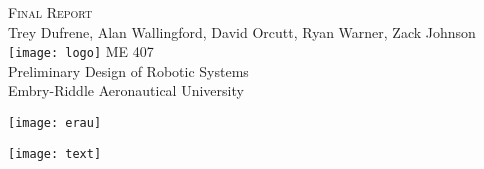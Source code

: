 \begin{titlepage}
\flushleft
\doublespacing
\Large
\textsc{Final Report} \\
\normalsize
Trey Dufrene, Alan Wallingford, David Orcutt, Ryan Warner, Zack Johnson
\vfill
\center
\texttt{[image: logo]}
\vfill
\flushleft
ME 407 \\
Preliminary Design of Robotic Systems \\
Embry-Riddle Aeronautical University \\
\vspace{2ex}
\begin{minipage}[c]{.5\textwidth}
\flushleft
\texttt{[image: erau]}
\end{minipage}%
\begin{minipage}[c]{.5\textwidth}
\flushright
\texttt{[image: text]}
\end{minipage}
\end{titlepage}
